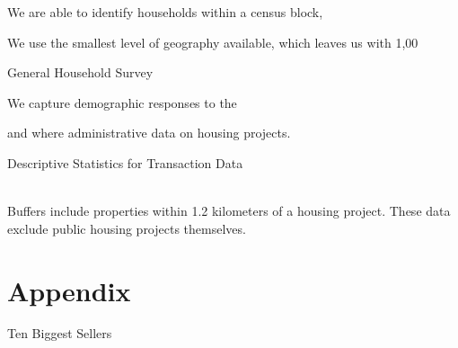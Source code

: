 \documentclass[12pt]{article}
\begin{document}
We are able to identify households within a census block,

We use the smallest level of geography available, which leaves us with 1,00



 General Household Survey







We capture demographic responses to the 

and where administrative data on housing projects.  


\begin{table}
	\centering
	\caption{Descriptive Statistics for Transaction Data}\label{table:descriptives}
	 \\
	\vspace{.2cm}
\footnotesize{Buffers include properties within 1.2 kilometers of a housing project.  These data exclude public housing projects themselves.}
\end{table}







{}
\nocite{*}
\singlespacing
\setlength\bibsep{0pt}






\appendix
\doublespacing

\section*{Appendix}

\begin{table}
	\centering
	\caption{Ten Biggest Sellers}\label{table:biggestsellers}
	
\end{table}
\end{document}
